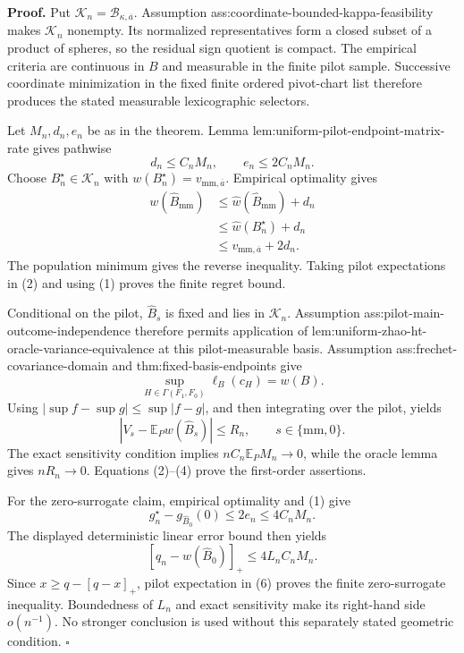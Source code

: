 \textbf{Proof.}
Put \(\mathcal K_n=\mathcal B_{\kappa,\overline a}\).  Assumption ass:coordinate-bounded-kappa-feasibility makes \(\mathcal K_n\) nonempty.  Its normalized representatives form a closed subset of a product of spheres, so the residual sign quotient is compact.  The empirical criteria are continuous in \(B\) and measurable in the finite pilot sample.  Successive coordinate minimization in the fixed finite ordered pivot-chart list therefore produces the stated measurable lexicographic selectors.

Let \(M_n,d_n,e_n\) be as in the theorem.  Lemma lem:uniform-pilot-endpoint-matrix-rate gives pathwise
\[
d_n\le C_nM_n,\qquad e_n\le2C_nM_n.
\tag{1}
\]
Choose \(B_n^\star\in\mathcal K_n\) with \(w(B_n^\star)=v_{\mathrm{mm},\overline a}\).  Empirical optimality gives
\[
\begin{aligned}
w(\widehat B_{\mathrm{mm}})
&\le\widehat w(\widehat B_{\mathrm{mm}})+d_n\\
&\le\widehat w(B_n^\star)+d_n\\
&\le v_{\mathrm{mm},\overline a}+2d_n.
\end{aligned}
\tag{2}
\]
The population minimum gives the reverse inequality.  Taking pilot expectations in (2) and using (1) proves the finite regret bound.

Conditional on the pilot, \(\widehat B_s\) is fixed and lies in \(\mathcal K_n\).  Assumption ass:pilot-main-outcome-independence therefore permits application of lem:uniform-zhao-ht-oracle-variance-equivalence at this pilot-measurable basis.  Assumption ass:frechet-covariance-domain and thm:fixed-basis-endpoints give
\[
\sup_{H\in\Gamma(F_1,F_0)}\ell_B(c_H)=w(B).
\tag{3}
\]
Using \(|\sup f-\sup g|\le\sup|f-g|\), and then integrating over the pilot, yields
\[
|V_s-\mathbb E_Pw(\widehat B_s)|\le R_n,
\qquad s\in\{\mathrm{mm},0\}.
\tag{4}
\]
The exact sensitivity condition implies \(nC_n\mathbb E_PM_n\to0\), while the oracle lemma gives \(nR_n\to0\).  Equations (2)--(4) prove the first-order assertions.

For the zero-surrogate claim, empirical optimality and (1) give
\[
g_n^\star-g_{\widehat B_0}(0)\le2e_n\le4C_nM_n.
\tag{5}
\]
The displayed deterministic linear error bound then yields
\[
[q_n-w(\widehat B_0)]_+\le4L_nC_nM_n.
\tag{6}
\]
Since \(x\ge q-[q-x]_+\), pilot expectation in (6) proves the finite zero-surrogate inequality.  Boundedness of \(L_n\) and exact sensitivity make its right-hand side \(o(n^{-1})\).  No stronger conclusion is used without this separately stated geometric condition. \(\square\)